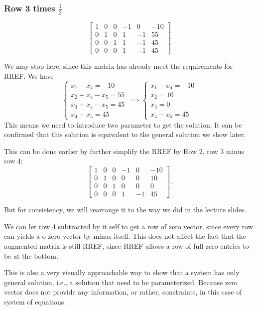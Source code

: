 \documentclass[12pt,a4paper]{article}
\begin{document}
\begin{solution}
\subsubsection*{Row 3 times $\frac{1}{2}$}
\[
\left[ \begin{array}{ccccc|c}
1 & 0 & 0 & -1 & 0 & -10 \\
0 & 1 & 0 & 1 & -1 & 55 \\
0 & 0 & 1 & 1 & -1 & 45 \\
0 & 0 & 0 & 1 & -1 & 45
\end{array} \right]
\]
\begin{remark}
    We may stop here, since this matrix has already meet the requirements for RREF. We have
    \[
    \begin{cases}
        x_1-x_4=-10\\
        x_2+x_4-x_5=55\\
        x_3+x_4-x_5=45\\
        x_4-x_5=45
    \end{cases}
    \implies 
    \begin{cases}
        x_1-x_4=-10\\
        x_2 = 10\\
        x_3 = 0\\
        x_4 - x_5 = 45
    \end{cases}
    \]
    This means we need to introduce two parameter to get the solution. It can be confirmed that this solution is equivalent to the general solution we show later.
    \begin{note}
        This can be done earlier by further simplify the RREF by Row 2, row 3 minus row 4:
        \[
        \left[ \begin{array}{ccccc|c}
        1 & 0 & 0 & -1 & 0 & -10 \\
        0 & 1 & 0 & 0 & 0 & 10 \\
        0 & 0 & 1 & 0 & 0 & 0 \\
        0 & 0 & 0 & 1 & -1 & 45
        \end{array} \right].
        \]
    \end{note}

    But for consistency, we will rearrange it to the way we did in the lecture slides.
\end{remark}
We can let row 4 subtracted by it self to get a row of zero vector, since every row can yields a o zero vector by minus itself. This does not affect the fact that the augmented matrix is still RREF, since RREF allows a row of full zero entries to be at the bottom.
\begin{note}
This is also a very visually approachable way to show that a system has only general solution, i.e., a solution that need to be parameterized. Because zero vector does not provide any information, or rather, constraints, in this case of system of equations.
\end{note}



\end{solution}
\end{document}
